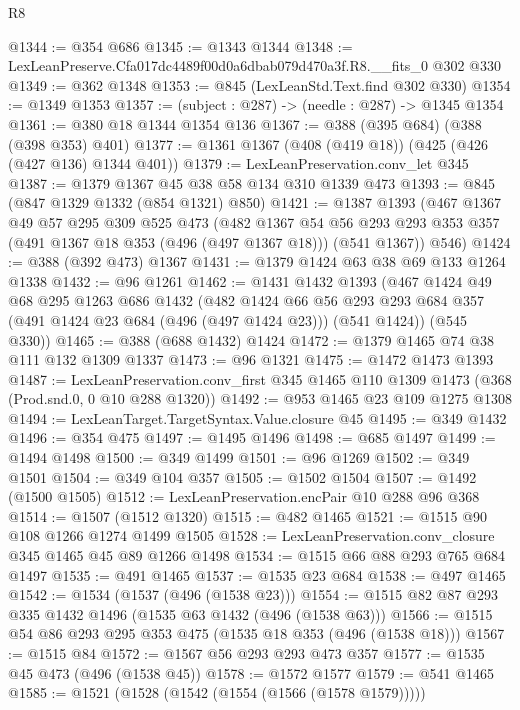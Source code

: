 \begin{lexlean}{R8}
\begin{coremodule}
@1344 := @354 @686
@1345 := @1343 @1344
@1348 := LexLeanPreserve.Cfa017dc4489f00d0a6dbab079d470a3f.R8.__fits_0 @302 @330
@1349 := @362 @1348
@1353 := @845 (LexLeanStd.Text.find @302 @330)
@1354 := @1349 @1353
@1357 := (subject : @287) -> (needle : @287) -> @1345 @1354
@1361 := @380 @18 @1344 @1354 @136
@1367 := @388 (@395 @684) (@388 (@398 @353) @401)
@1377 := @1361 @1367 (@408 (@419 @18)) (@425 (@426 (@427 @136) @1344 @401))
@1379 := LexLeanPreservation.conv_let @345
@1387 := @1379 @1367 @45 @38 @58 @134 @310 @1339 @473
@1393 := @845 (@847 @1329 @1332 (@854 @1321) @850)
@1421 := @1387
    @1393
    (@467
      @1367
      @49
      @57
      @295
      @309
      @525
      @473
      (@482
        @1367
        @54
        @56
        @293
        @293
        @353
        @357
        (@491 @1367 @18 @353 (@496 (@497 @1367 @18)))
        (@541 @1367))
      @546)
@1424 := @388 (@392 @473) @1367
@1431 := @1379 @1424 @63 @38 @69 @133 @1264 @1338
@1432 := @96 @1261
@1462 := @1431
    @1432
    @1393
    (@467
      @1424
      @49
      @68
      @295
      @1263
      @686
      @1432
      (@482
        @1424
        @66
        @56
        @293
        @293
        @684
        @357
        (@491 @1424 @23 @684 (@496 (@497 @1424 @23)))
        (@541 @1424))
      (@545 @330))
@1465 := @388 (@688 @1432) @1424
@1472 := @1379 @1465 @74 @38 @111 @132 @1309 @1337
@1473 := @96 @1321
@1475 := @1472 @1473 @1393
@1487 := LexLeanPreservation.conv_first
    @345
    @1465
    @110
    @1309
    @1473
    (@368 (Prod.snd.{0, 0} @10 @288 @1320))
@1492 := @953 @1465 @23 @109 @1275 @1308
@1494 := LexLeanTarget.TargetSyntax.Value.closure @45
@1495 := @349 @1432
@1496 := @354 @475
@1497 := @1495 @1496
@1498 := @685 @1497
@1499 := @1494 @1498
@1500 := @349 @1499
@1501 := @96 @1269
@1502 := @349 @1501
@1504 := @349 @104 @357
@1505 := @1502 @1504
@1507 := @1492 (@1500 @1505)
@1512 := LexLeanPreservation.encPair @10 @288 @96 @368
@1514 := @1507 (@1512 @1320)
@1515 := @482 @1465
@1521 := @1515 @90 @108 @1266 @1274 @1499 @1505
@1528 := LexLeanPreservation.conv_closure @345 @1465 @45 @89 @1266 @1498
@1534 := @1515 @66 @88 @293 @765 @684 @1497
@1535 := @491 @1465
@1537 := @1535 @23 @684
@1538 := @497 @1465
@1542 := @1534 (@1537 (@496 (@1538 @23)))
@1554 := @1515 @82 @87 @293 @335 @1432 @1496 (@1535 @63 @1432 (@496 (@1538 @63)))
@1566 := @1515 @54 @86 @293 @295 @353 @475 (@1535 @18 @353 (@496 (@1538 @18)))
@1567 := @1515 @84
@1572 := @1567 @56 @293 @293 @473 @357
@1577 := @1535 @45 @473 (@496 (@1538 @45))
@1578 := @1572 @1577
@1579 := @541 @1465
@1585 := @1521 (@1528 (@1542 (@1554 (@1566 (@1578 @1579)))))

\end{coremodule}
\end{lexlean}
